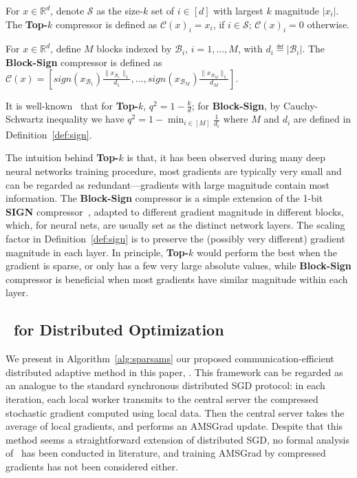 \documentclass[11pt]{article}
\begin{document}
\begin{definition}[Top-$k$]\label{def:topk}
For $x\in\mathbb R^d$, denote $\mathcal S$ as the size-$k$ set of $i\in[d]$ with largest $k$ magnitude $|x_i|$. The \textbf{Top-$k$} compressor is defined as $\mathcal C(x)_i=x_i$, if $i\in\mathcal S$; $\mathcal C(x)_i=0$ otherwise.
\end{definition}

\begin{definition}\label{def:sign}
For $x\in\mathbb R^d$, define $M$ blocks indexed by $\mathcal B_i$, $i=1,...,M$, with $d_i\eqdef |\mathcal B_i|$. The \textbf{Block-Sign} compressor is defined as $\mathcal C(x)=[sign(x_{\mathcal B_1})\frac{\|x_{\mathcal B_1}\|_1}{d_1},..., sign(x_{\mathcal B_M}) \frac{\|x_{\mathcal B_M}\|_1}{d_M}]$. 
\end{definition}

\begin{Remark}
It is well-known~\cite{stich2018sparsified,Proc:Zheng_NIPS19} that for \textbf{Top-$k$}, $q^2=1-\frac{k}{d}$; for \textbf{Block-Sign}, by Cauchy-Schwartz inequality we have $q^2=1-\min_{i\in [M]} \frac{1}{d_i}$ where $M$ and $d_i$ are defined in Definition~\ref{def:sign}.
\end{Remark}

The intuition behind \textbf{Top-$k$} is that, it has been observed during many deep neural networks training procedure, most gradients are typically very small and can be regarded as redundant---gradients with large magnitude contain most information. The \textbf{Block-Sign} compressor is a simple extension of the 1-bit \textbf{SIGN} compressor~\cite{Proc:Seide14,bernstein2018signsgd}, adapted to different gradient magnitude in different blocks, which, for neural nets, are usually set as the distinct network layers. The scaling factor in Definition~\ref{def:sign} is to preserve the (possibly very different) gradient magnitude in each layer. In principle, \textbf{Top-$k$} would perform the best when the gradient is sparse, or only has a few very large absolute values, while \textbf{Block-Sign} compressor is beneficial when most gradients have similar magnitude within each layer.


\subsection{\algo\ for Distributed Optimization}


We present in Algorithm~\ref{alg:sparsams} our proposed communication-efficient distributed adaptive method in this paper, \algo. This framework can be regarded as an analogue to the standard synchronous distributed SGD protocol: in each iteration, each local worker transmits to the central server the compressed stochastic gradient computed using local data. Then the central server takes the average of local gradients, and performs an AMSGrad update. Despite that this method seems a straightforward extension of distributed SGD, no formal analysis of \algo\ has been conducted in literature, and training AMSGrad by compressed gradients has not been considered either.
\end{document}
